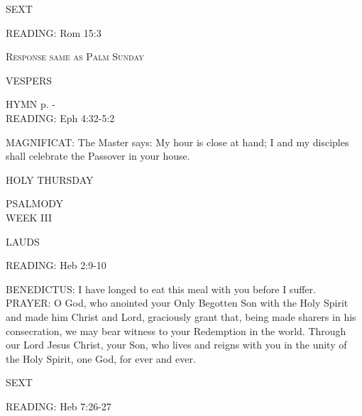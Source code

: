 \begin{flushleft}\normalsize{\uppercase{SEXT\\}}\end{flushleft}
\noindent\small{\uppercase{READING:}}    Rom 15:3 \textbf{   \\}

\begin{center}\textsc{Response same as Palm Sunday}\end{center}

\begin{flushleft}\normalsize{\uppercase{VESPERS\\}}\end{flushleft}
\small{\uppercase{HYMN} p. \pageref{lent:firstHymn}-\pageref{lent:lastHymn}\\}
\noindent\small{\uppercase{READING:}}    Eph 4:32-5:2 \textbf{   \\}

\noindent\small{\uppercase{MAGNIFICAT:}}	The Master says: My hour is close at hand; I and my disciples shall celebrate the Passover in your house.\\

\begin{center}
\normalsize HOLY THURSDAY
\end{center}
\noindent\small{\uppercase{PSALMODY}\\} WEEK III

\begin{flushleft}\normalsize{\uppercase{LAUDS\\}}\end{flushleft}
\noindent\small{\uppercase{READING:}}    Heb 2:9-10 \textbf{   \\}

\noindent\small{\uppercase{BENEDICTUS:}}	I have longed to eat this meal with you before I suffer.\\

\noindent\small{\uppercase{PRAYER:}}	O God, who anointed your Only Begotten Son with the Holy Spirit and made him Christ and Lord, graciously grant that, being made sharers in his consecration, we may bear witness to your Redemption in the world. Through our Lord Jesus Christ, your Son, who lives and reigns with you in the unity of the Holy Spirit, one God, for ever and ever.

\begin{flushleft}\normalsize{\uppercase{SEXT\\}}\end{flushleft}
\noindent\small{\uppercase{READING:}}    Heb 7:26-27 \textbf{   \\}

